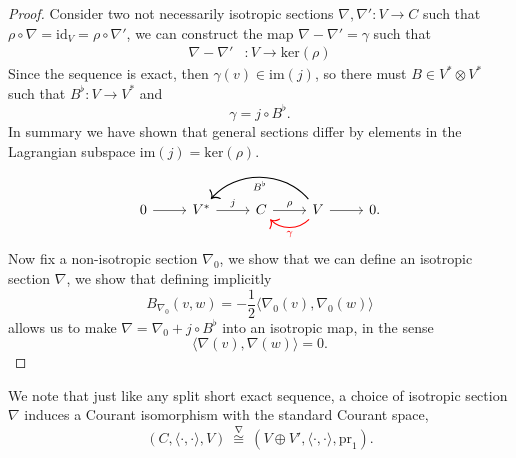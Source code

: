 \begin{proof}
    Consider two not necessarily isotropic sections $\nabla, \nabla' : V \rightarrow C$ such that $\rho \circ \nabla = \mathrm{id}_V = \rho \circ \nabla'$, we can construct the map $\nabla - \nabla' = \gamma$ such that
    \begin{align*}
        \nabla - \nabla' &: V \rightarrow \mathrm{ker}(\rho)
    \end{align*} 
    Since the sequence is exact, then $\gamma(v) \in \mathrm{im}(j)$, so there must  $B \in V^* \otimes V^*$ such that $B^\flat : V \rightarrow V^*$ and
    \begin{equation}
        \gamma = j \circ B^\flat.
    \end{equation}
    In summary we have shown that general sections differ by elements in the Lagrangian subspace $\mathrm{im}(j) = \mathrm{ker}(\rho)$.
    \begin{equation*}
        \begin{tikzcd}
            0 \arrow[]{r}& V^* \arrow["j"]{r}& C \arrow["\rho"]{r}& V \arrow[]{r} \arrow[bend left = 45, color = red, "\gamma", thick]{l} \arrow[bend right = 50, "B^\flat", thick]{ll} & 0.
        \end{tikzcd}
    \end{equation*}
    Now fix a non-isotropic section $\nabla_0$, we show that we can define an isotropic section $\nabla$, we show that defining implicitly
    \begin{equation}
        B_{\nabla_0}(v,w) = -\frac{1}{2}\langle \nabla_0(v), \nabla_0(w) \rangle
    \end{equation}
    allows us to make $\nabla = \nabla_0 + j \circ B^\flat$ into an isotropic map, in the sense
    \begin{equation}
        \langle   \nabla(v), \nabla(w)\rangle = 0.
    \end{equation}
\end{proof}
% 
We note that just like any split short exact sequence, a choice of isotropic section $\nabla$ induces a Courant isomorphism with the standard Courant space,
\begin{equation}
    (C,\langle \cdot,\cdot \rangle, V) \:\overset{\nabla}{\cong} \:(V \oplus V', \langle \cdot,\cdot \rangle, \mathrm{pr}_1).
\end{equation}

